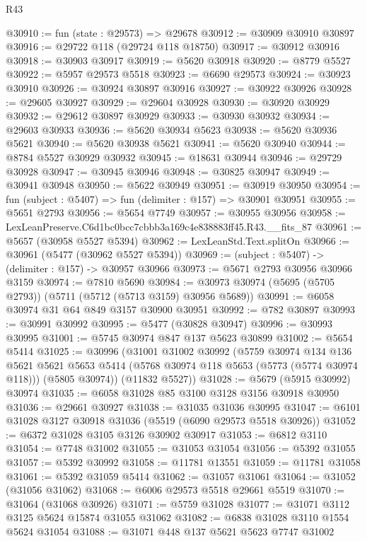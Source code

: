 \begin{lexlean}{R43}
\begin{coremodule}
@30910 := fun (state : @29573) => @29678
@30912 := @30909 @30910 @30897
@30916 := @29722 @118 (@29724 @118 @18750)
@30917 := @30912 @30916
@30918 := @30903 @30917
@30919 := @5620 @30918
@30920 := @8779 @5527
@30922 := @5957 @29573 @5518
@30923 := @6690 @29573
@30924 := @30923 @30910
@30926 := @30924 @30897 @30916
@30927 := @30922 @30926
@30928 := @29605 @30927
@30929 := @29604 @30928
@30930 := @30920 @30929
@30932 := @29612 @30897 @30929
@30933 := @30930 @30932
@30934 := @29603 @30933
@30936 := @5620 @30934 @5623
@30938 := @5620 @30936 @5621
@30940 := @5620 @30938 @5621
@30941 := @5620 @30940
@30944 := @8784 @5527 @30929 @30932
@30945 := @18631 @30944
@30946 := @29729 @30928
@30947 := @30945 @30946
@30948 := @30825 @30947
@30949 := @30941 @30948
@30950 := @5622 @30949
@30951 := @30919 @30950
@30954 := fun (subject : @5407) => fun (delimiter : @157) => @30901 @30951
@30955 := @5651 @2793
@30956 := @5654 @7749
@30957 := @30955 @30956
@30958 := LexLeanPreserve.C6d1bc0bcc7cbbb3a169c4e838883ff45.R43.__fits_87
@30961 := @5657 (@30958 @5527 @5394)
@30962 := LexLeanStd.Text.splitOn
@30966 := @30961 (@5477 (@30962 @5527 @5394))
@30969 := (subject : @5407) -> (delimiter : @157) -> @30957 @30966
@30973 := @5671 @2793 @30956 @30966 @3159
@30974 := @7810 @5690
@30984 := @30973 @30974 (@5695 (@5705 @2793)) (@5711 (@5712 (@5713 @3159) @30956 @5689))
@30991 := @6058 @30974 @31 @64 @849 @3157 @30900 @30951
@30992 := @782 @30897
@30993 := @30991 @30992
@30995 := @5477 (@30828 @30947)
@30996 := @30993 @30995
@31001 := @5745 @30974 @847 @137 @5623 @30899
@31002 := @5654 @5414
@31025 := @30996
    (@31001
      @31002
      @30992
      (@5759
        @30974
        @134
        @136
        @5621
        @5621
        @5653
        @5414
        (@5768 @30974 @118 @5653 (@5773 (@5774 @30974 @118)))
        (@5805 @30974))
      (@11832 @5527))
@31028 := @5679 (@5915 @30992) @30974
@31035 := @6058 @31028 @85 @3100 @3128 @3156 @30918 @30950
@31036 := @29661 @30927
@31038 := @31035 @31036 @30995
@31047 := @6101 @31028 @3127 @30918 @31036 (@5519 (@6090 @29573 @5518 @30926))
@31052 := @6372 @31028 @3105 @3126 @30902 @30917
@31053 := @6812 @3110
@31054 := @7748 @31002
@31055 := @31053 @31054
@31056 := @5392 @31055
@31057 := @5392 @30992
@31058 := @11781 @13551
@31059 := @11781 @31058
@31061 := @5392 @31059 @5414
@31062 := @31057 @31061
@31064 := @31052 (@31056 @31062)
@31068 := @6006 @29573 @5518 @29661 @5519
@31070 := @31064 (@31068 @30926)
@31071 := @5759 @31028
@31077 := @31071 @3112 @3125 @5624 @15874 @31055 @31062
@31082 := @6838 @31028 @3110 @1554 @5624 @31054
@31088 := @31071 @448 @137 @5621 @5623 @7747 @31002

\end{coremodule}
\end{lexlean}
